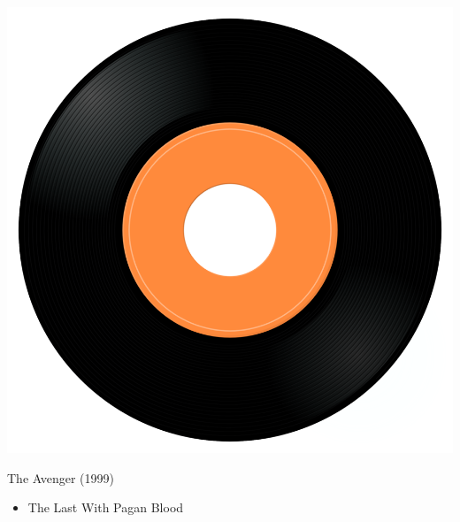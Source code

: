 \begin{minipage}[t]{0.25\textwidth}\vspace{0pt}
\captionsetup{type=figure}
\includegraphics[width=\textwidth]{Images/cover.png}
\caption*{The Avenger (1999)}
\end{minipage}
\begin{minipage}[t]{0.25\textwidth}\vspace{0pt}
\begin{itemize}[nosep,leftmargin=1em,labelwidth=*,align=left]
	\setlength{\itemsep}{0pt}
	\item The Last With Pagan Blood
\end{itemize}
\end{minipage}
